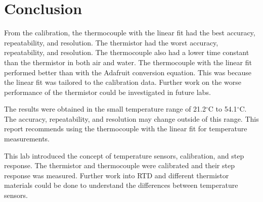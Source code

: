 \section{Conclusion}
\label{sec:conclusion}

\noindent From the calibration, the thermocouple with the linear fit had the best accuracy, repeatability, and resolution.
The thermistor had the worst accuracy, repeatability, and resolution. The thermocouple also had a lower time constant
than the thermistor in both air and water. The thermocouple with the linear fit performed better than with the Adafruit
conversion equation. This was because the linear fit was tailored to the calibration data. Further work on the worse performance
of the thermistor could be investigated in future labs.

The results were obtained in the small temperature range of 21.2$^\circ$C to 54.1$^\circ$C. The accuracy, repeatability, and resolution
may change outside of this range. This report recommends using the thermocouple with the linear fit for temperature measurements.

This lab introduced the concept of temperature sensors, calibration, and step response. The thermistor and thermocouple
were calibrated and their step response was measured. Further work into RTD and different thermistor materials
could be done to understand the differences between temperature sensors.
